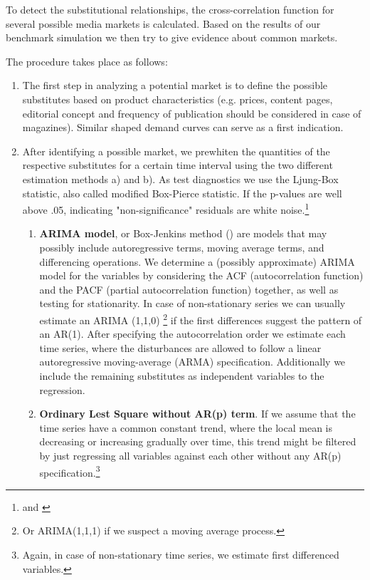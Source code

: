 \documentclass[10pt,a4paper]{scrreprt}
\begin{document}
To detect the substitutional relationships, the cross-correlation function for several possible media markets is calculated. Based on the results of our benchmark simulation we then try to give evidence about common markets. 

The procedure takes place as follows: \begin{enumerate}
	\item The first step in analyzing a potential market is to define the possible substitutes based on product characteristics (e.g. prices, content pages, editorial concept and frequency of publication should be considered in case of magazines). Similar shaped demand curves can serve as a first indication. 
	\item After identifying a possible market, we prewhiten the quantities of the respective substitutes for a certain time interval using the two different estimation methods a) and b). As test diagnostics we use the Ljung-Box statistic, also called modified Box-Pierce statistic. If the p-values are well above .05, indicating "non-significance" residuals are white noise.\footnote{\cite{box_distribution_1970} and \cite{ljung_measure_1978}} 
	\begin{enumerate}
		\item \textbf{ARIMA model}, or Box-Jenkins method (\cite{box_time_2008}) are models that may possibly include autoregressive terms, moving average terms, and differencing operations.  We determine a (possibly approximate) ARIMA model for the variables by considering the ACF (autocorrelation function) and the PACF (partial autocorrelation function) together, as well as testing for stationarity. In case of non-stationary series we can usually estimate an ARIMA (1,1,0) \footnote{Or ARIMA(1,1,1) if we suspect a moving average process.} if the first differences suggest the pattern of an AR(1). After specifying the autocorrelation order we estimate each time series, where the disturbances are allowed to follow a linear autoregressive moving-average (ARMA) specification. Additionally we include the remaining substitutes as independent variables to the regression.
		\item \textbf{Ordinary Lest Square without AR(p) term}. If we assume that the time series have a common constant trend, where the local mean is decreasing or increasing gradually over time, this trend might be filtered by just regressing all variables against each other without any AR(p) specification.\footnote{Again, in case of non-stationary time series, we estimate first differenced variables.} 

\end{enumerate}
\end{enumerate}
\end{document}
